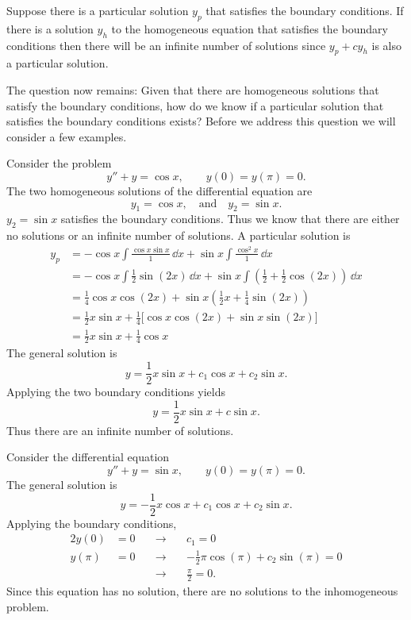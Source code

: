 Suppose there is
a particular solution $y_p$ that satisfies the boundary conditions.
If there is a solution $y_h$ to the homogeneous equation that satisfies
the boundary conditions then there will be an infinite number of solutions
since $y_p + c y_h$ is also a particular solution.

The question now remains: Given that there are homogeneous solutions that 
satisfy the boundary conditions, how do we know if a particular solution that
satisfies the boundary conditions exists?  
Before we address this question we will consider a few examples.



\begin{Example}
  \label{fred3}
  Consider the problem
  \[ y'' + y = \cos x, \qquad y(0) = y(\pi) = 0. \]
  The two homogeneous solutions of the differential equation are
  \[ y_1 = \cos x, \quad \mathrm{and} \quad y_2 = \sin x.\]
  $y_2 = \sin x$ satisfies the boundary conditions.  Thus we know that there are
  either no solutions or an infinite number of solutions.
  A particular solution is
  \begin{align*}
    y_p     &= -\cos x \int \frac{\cos x \sin x}{1} \,\dd x
    + \sin x \int \frac{\cos^2 x}{1} \,\dd x \\
    &= -\cos x \int \frac{1}{2} \sin(2 x) \,\dd x
    + \sin x \int \left( \frac{1}{2} + \frac{1}{2} \cos(2 x) 
    \right)\,\dd x \\
    &= \frac{1}{4} \cos x \cos(2x) + \sin x \left( \frac{1}{2}x
      + \frac{1}{4} \sin(2x) \right) \\
    &= \frac{1}{2} x \sin x + \frac{1}{4} \big[ \cos x \cos(2x) 
    + \sin x \sin(2x) \big] \\
    &= \frac{1}{2} x \sin x + \frac{1}{4} \cos x
  \end{align*}
  The general solution is
  \[ y = \frac{1}{2} x \sin x + c_1 \cos x + c_2 \sin x. \]
  Applying the two boundary conditions yields
  \[ y = \frac{1}{2} x \sin x + c \sin x.\]
  Thus there are an infinite number of solutions.
\end{Example}






\begin{Example}
  \label{fred4}
  Consider the differential equation
  \[ y'' + y = \sin x, \qquad y(0) = y(\pi) = 0. \]
  The general solution is
  \[ y = - \frac{1}{2} x \cos x + c_1 \cos x + c_2 \sin x. \]
  Applying the boundary conditions,
  \begin{alignat*}{2}
    y(0) &= 0 \quad &\to \quad &c_1 = 0 \\
    y(\pi) &= 0 \quad &\to \quad &-\frac{1}{2} \pi \cos(\pi) + c_2 \sin(\pi)=0\\
    & &\to \quad &\frac{\pi}{2} = 0.
  \end{alignat*}
  Since this equation has no solution, there are no solutions to the 
  inhomogeneous problem.
\end{Example}




